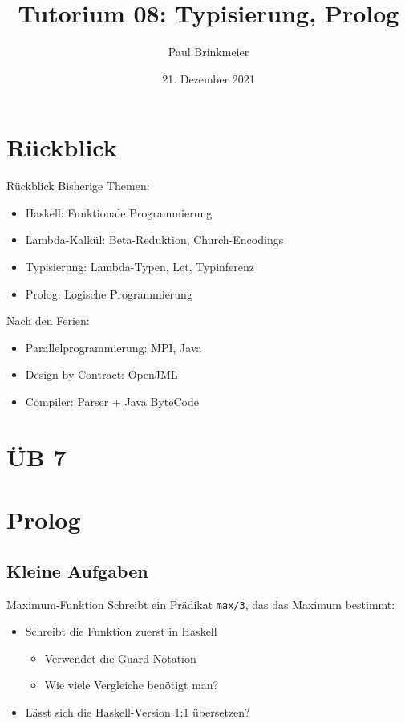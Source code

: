 \documentclass{beamer}
\title{Tutorium 08: Typisierung, Prolog}
\author{Paul Brinkmeier}
\institute{Tutorium Programmierparadigmen am KIT}
\date{21. Dezember 2021}
\begin{document}
\begin{frame}
    \titlepage
\end{frame}

\section{Rückblick}

\begin{frame}{Rückblick}
    Bisherige Themen:

    \begin{itemize}
        \item Haskell: Funktionale Programmierung
        \item Lambda-Kalkül: Beta-Reduktion, Church-Encodings
        \item Typisierung: Lambda-Typen, Let, Typinferenz
        \item Prolog: Logische Programmierung
    \end{itemize}

    Nach den Ferien:

    \begin{itemize}
        \item Parallelprogrammierung: MPI, Java
        \item Design by Contract: OpenJML
        \item Compiler: Parser + Java ByteCode
    \end{itemize}
\end{frame}

\section{ÜB 7}

\section{Prolog}

\subsection{Kleine Aufgaben}

\begin{frame}{Maximum-Funktion}
    Schreibt ein Prädikat \texttt{max/3}, das das Maximum bestimmt:


    \begin{itemize}
        \item Schreibt die Funktion zuerst in Haskell
        \begin{itemize}
            \item Verwendet die Guard-Notation
            \item Wie viele Vergleiche benötigt man?
        \end{itemize}
        \item Lässt sich die Haskell-Version 1:1 übersetzen?
    \end{itemize}
\end{frame}
\end{document}
